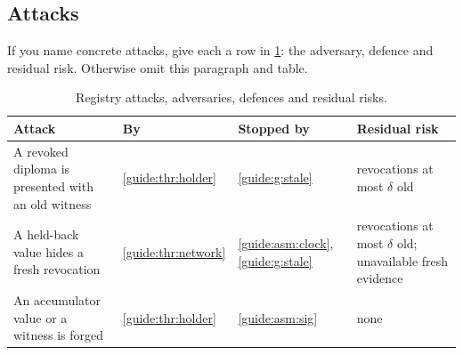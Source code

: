 \subsection[Attacks]{Attacks\skimmark}\label{guide:chapters:attacks}
If you name concrete attacks, give each a row in \cref{guide:tab:attacks}: the adversary, defence and residual risk. Otherwise omit this paragraph and table.
\begin{table}[!ht]
  \centering
  \caption{Registry attacks, adversaries, defences and residual risks.}
  \label{guide:tab:attacks}
  {\small
  \begin{tabularx}{\linewidth}{>{\raggedright\arraybackslash}X l >{\raggedright\arraybackslash}X >{\raggedright\arraybackslash}X}
    \toprule
    \textbf{Attack} & \textbf{By} & \textbf{Stopped by} & \textbf{Residual risk} \\
    \midrule
    A revoked diploma is presented with an old witness & \cref{guide:thr:holder} & \cref{guide:g:stale} & revocations at most $\delta$ old \\
    A held-back value hides a fresh revocation & \cref{guide:thr:network} & \cref{guide:asm:clock}, \cref{guide:g:stale} & revocations at most $\delta$ old; unavailable fresh evidence \\
    An accumulator value or a witness is forged & \cref{guide:thr:holder} & \cref{guide:asm:sig} & none \\
    \bottomrule
  \end{tabularx}
  }
\end{table}

